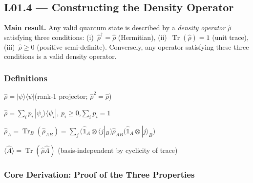 \documentclass[11pt,a4paper]{article}
\begin{document}

\subsection{L01.4 --- Constructing the Density Operator}
\label{sec:L01.3.2}

\begin{tcolorbox}[goldbox]
\textbf{Main result.}
Any valid quantum state is described by a \emph{density operator} $\hat{\rho}$
satisfying three conditions: (i)~$\hat{\rho}^\dagger=\hat{\rho}$ (Hermitian),
(ii)~$\operatorname{Tr}(\hat{\rho})=1$ (unit trace), (iii)~$\hat{\rho}\ge 0$
(positive semi-definite). Conversely, any operator satisfying these three conditions
is a valid density operator.
\end{tcolorbox}

\subsubsection*{Definitions}

\begin{description}[leftmargin=1.5em]
  \item[\textbf{Pure state:}]
    $\hat{\rho}=|\psi\rangle\langle\psi|$\quad (rank-1 projector; $\hat{\rho}^2=\hat{\rho}$)

  \item[\textbf{Statistical mixture:}]
    $\hat{\rho}=\displaystyle\sum_i p_i\,|\psi_i\rangle\langle\psi_i|$,\quad
    $p_i\ge 0$,\quad $\displaystyle\sum_i p_i=1$

  \item[\textbf{Reduced density operator:}]
    $\hat{\rho}_A=\operatorname{Tr}_B(\hat{\rho}_{AB})
     =\displaystyle\sum_j\bigl(\hat{\mathbb{1}}_A\otimes\langle j|_B\bigr)
     \hat{\rho}_{AB}
     \bigl(\hat{\mathbb{1}}_A\otimes|j\rangle_B\bigr)$

  \item[\textbf{Expectation value:}]
    $\langle\hat{A}\rangle=\operatorname{Tr}(\hat{\rho}\hat{A})$
    \quad (basis-independent by cyclicity of trace)
\end{description}

\subsubsection*{Core Derivation: Proof of the Three Properties}
\label{sec:L01.3.2.proof}
\end{document}
